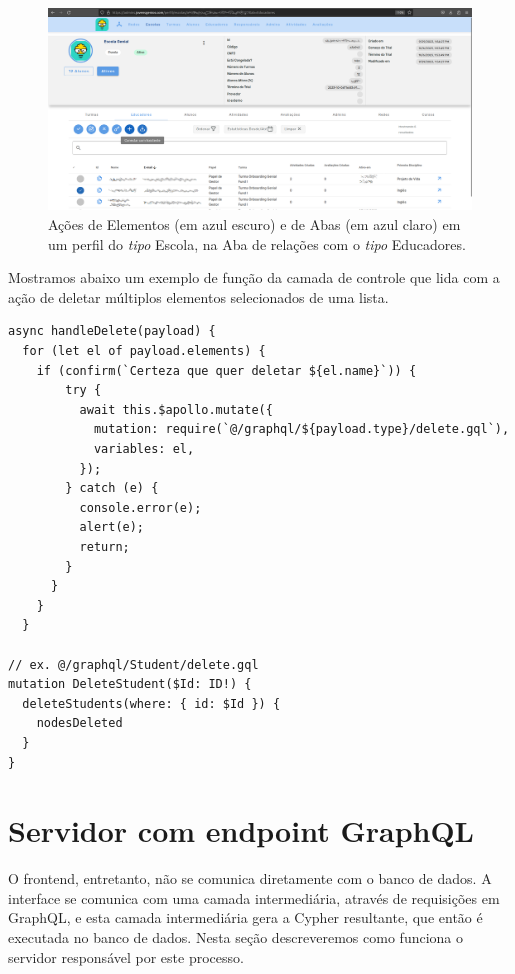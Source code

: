 \begin{figure}
    \centering
    \includegraphics[width=1\linewidth]{Imagens/chap04/front-other-actions.png}
    \caption{Ações de Elementos (em azul escuro) e de Abas (em azul claro) em um perfil do \textit{tipo} Escola, na Aba de relações com o \textit{tipo} Educadores.}
    \label{fig:front-other-actions}
\end{figure}
Mostramos abaixo um exemplo de função da camada de controle que lida com a ação de deletar múltiplos elementos selecionados de uma lista.

\begin{lstlisting}
async handleDelete(payload) {
  for (let el of payload.elements) {
    if (confirm(`Certeza que quer deletar ${el.name}`)) {
        try {
          await this.$apollo.mutate({
            mutation: require(`@/graphql/${payload.type}/delete.gql`),
            variables: el,
          });
        } catch (e) {
          console.error(e);
          alert(e);
          return;
        }
      }
    }
  }

// ex. @/graphql/Student/delete.gql
mutation DeleteStudent($Id: ID!) {
  deleteStudents(where: { id: $Id }) {
    nodesDeleted
  }
}
\end{lstlisting}

\section{Servidor com endpoint GraphQL}

O frontend, entretanto, não se comunica diretamente com o banco de dados. A interface se comunica com uma camada intermediária, através de requisições em GraphQL, e esta camada intermediária gera a Cypher resultante, que então é executada no banco de dados. Nesta seção descreveremos como funciona o servidor responsável por este processo.

